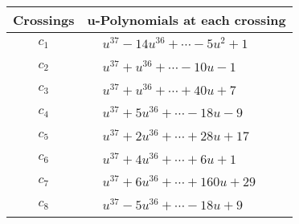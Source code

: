 \documentclass[1p]{elsarticle_modified}
\theoremstyle{definition}
\begin{document}
\begin{tabular}{m{50pt}|m{274pt}}
Crossings & \hspace{64pt}u-Polynomials at each crossing \\
\hline $$\begin{aligned}c_{1}\end{aligned}$$&$\begin{aligned}
&u^{37}-14 u^{36}+\cdots-5 u^2+1
\end{aligned}$\\
\hline $$\begin{aligned}c_{2}\end{aligned}$$&$\begin{aligned}
&u^{37}+u^{36}+\cdots-10 u-1
\end{aligned}$\\
\hline $$\begin{aligned}c_{3}\end{aligned}$$&$\begin{aligned}
&u^{37}+u^{36}+\cdots+40 u+7
\end{aligned}$\\
\hline $$\begin{aligned}c_{4}\end{aligned}$$&$\begin{aligned}
&u^{37}+5 u^{36}+\cdots-18 u-9
\end{aligned}$\\
\hline $$\begin{aligned}c_{5}\end{aligned}$$&$\begin{aligned}
&u^{37}+2 u^{36}+\cdots+28 u+17
\end{aligned}$\\
\hline $$\begin{aligned}c_{6}\end{aligned}$$&$\begin{aligned}
&u^{37}+4 u^{36}+\cdots+6 u+1
\end{aligned}$\\
\hline $$\begin{aligned}c_{7}\end{aligned}$$&$\begin{aligned}
&u^{37}+6 u^{36}+\cdots+160 u+29
\end{aligned}$\\
\hline $$\begin{aligned}c_{8}\end{aligned}$$&$\begin{aligned}
&u^{37}-5 u^{36}+\cdots-18 u+9
\end{aligned}$\\

\end{tabular}
\end{document}
